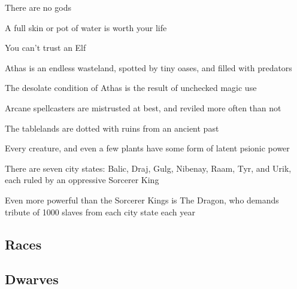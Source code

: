 \begin{multicols}{2}

\begin{description}
    \item There are no gods
    \item A full skin or pot of water is worth your life
    \item You can’t trust an Elf
    \item Athas is an endless wasteland, spotted by tiny oases, and filled with predators
    \item The desolate condition of Athas is the result of unchecked magic use
    \item Arcane spellcasters are mistrusted at best, and reviled more often than not
    \item The tablelands are dotted with ruins from an ancient past
    \item Every creature, and even a few plants have some form of latent psionic power
    \item There are seven city states: Balic, Draj, Gulg, Nibenay, Raam, Tyr, and Urik, each ruled by an oppressive Sorcerer King
    \item Even more powerful than the Sorcerer Kings is The Dragon, who demands tribute of 1000 slaves from each city state each year
\end{description}

\subsection{Races}
\subsection{Dwarves}


\end{multicols}
